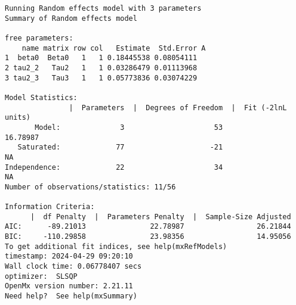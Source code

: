 \documentclass[11pt]{article}
\begin{document}
\begin{verbatim}
Running Random effects model with 3 parameters
Summary of Random effects model 
 
free parameters:
    name matrix row col   Estimate  Std.Error A
1  beta0  Beta0   1   1 0.18445538 0.08054111  
2 tau2_2   Tau2   1   1 0.03286479 0.01113968  
3 tau2_3   Tau3   1   1 0.05773836 0.03074229  

Model Statistics: 
               |  Parameters  |  Degrees of Freedom  |  Fit (-2lnL units)
       Model:              3                     53              16.78987
   Saturated:             77                    -21                    NA
Independence:             22                     34                    NA
Number of observations/statistics: 11/56

Information Criteria: 
      |  df Penalty  |  Parameters Penalty  |  Sample-Size Adjusted
AIC:      -89.21013               22.78987                 26.21844
BIC:     -110.29858               23.98356                 14.95056
To get additional fit indices, see help(mxRefModels)
timestamp: 2024-04-29 09:20:10 
Wall clock time: 0.06778407 secs 
optimizer:  SLSQP 
OpenMx version number: 2.21.11 
Need help?  See help(mxSummary)
\end{verbatim}
\end{document}

